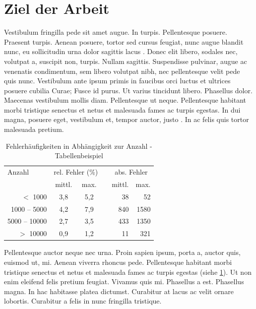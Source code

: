 \section{Ziel der Arbeit}

Vestibulum fringilla pede sit amet augue. In turpis. Pellentesque posuere. Praesent turpis. Aenean posuere, tortor sed cursus feugiat, nunc augue blandit nunc, eu sollicitudin urna dolor sagittis lacus \cite{Lammel.2012}. Donec elit libero, sodales nec, volutpat a, suscipit non, turpis. Nullam sagittis. Suspendisse pulvinar, augue ac venenatis condimentum, sem libero volutpat nibh, nec pellentesque velit pede quis nunc. Vestibulum ante ipsum primis in faucibus orci luctus et ultrices posuere cubilia Curae; Fusce id purus. Ut varius tincidunt libero. Phasellus dolor. Maecenas vestibulum mollis diam. Pellentesque ut neque. Pellentesque habitant morbi tristique senectus et netus et malesuada fames ac turpis egestas. In dui magna, posuere eget, vestibulum et, tempor auctor, justo \cite{Kelly.2008}. In ac felis quis tortor malesuada pretium. 

\begin{table} [ht]
\centering
	\begin{tabular}{rcccrr}
		\toprule
		\multicolumn{1}{l}{Anzahl}&
		\multicolumn{2}{c}{rel. Fehler (\%)}&&
		\multicolumn{2}{c}{abs. Fehler}\\
		\cmidrule{2-3}
		\cmidrule{5-6}
		& mittl. & max. && mittl. & max. \\
		\midrule
		$<$ 1000      & 3,8 & 5,2 && 38 & 52\\
		1000 -- 5000  & 4,2 & 7,9 && 840 & 1580\\
		5000 -- 10000 & 2,7 & 3,5 && 433 & 1350\\
		$>$ 10000     & 0,9 & 1,2 && 11 & 321\\
		\bottomrule
	\end{tabular}
	\caption[Hier steht die TabellenCaption]{Fehlerhäufigkeiten in Abhängigkeit zur Anzahl - Tabellenbeispiel}
	\label{tab:Auswertungskategorien}
\end{table}

Pellentesque auctor neque nec urna. Proin sapien ipsum, porta a, auctor quis, euismod ut, mi. Aenean viverra rhoncus pede. Pellentesque habitant morbi tristique senectus et netus et malesuada fames ac turpis egestas (siehe \ref{tab:Auswertungskategorien}). Ut non enim eleifend felis pretium feugiat. Vivamus quis mi. Phasellus a est. Phasellus magna. In hac habitasse platea dictumst. Curabitur at lacus ac velit ornare lobortis. Curabitur a felis in nunc fringilla tristique.

